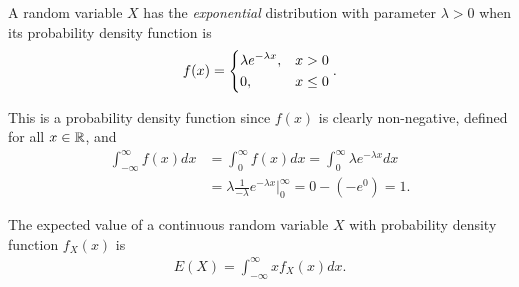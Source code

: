 \begin{defn}
    A random variable $X$ has the \emph{exponential} distribution with parameter $\lambda > 0$ when its probability density function is
    \begin{align}
        f(x) = \begin{dcases}
            \lambda e^{-\lambda x}, & x > 0 \\
            0, & x \leq 0
        \end{dcases}.
    \end{align}
\end{defn}

\begin{exmp}
    This is a probability density function since $f(x)$ is clearly non-negative, defined for all $x \in \mathbb{R}$, and
    \begin{align*}
        \int_{-\infty}^{\infty}f(x)dx &= \int_{0}^{\infty}f(x)dx = \int_{0}^{\infty}\lambda e^{-\lambda x}dx \\
        &= \lambda \frac{1}{-\lambda}e^{-\lambda x}\big\rvert_{0}^{\infty} = 0 - (-e^{0}) = 1.
    \end{align*}
\end{exmp}

\begin{defn}
    The expected value of a continuous random variable $X$ with probability density function $f_X(x)$ is
    \begin{align*}
        E(X) = \int_{-\infty}^{\infty}xf_X(x)dx.
    \end{align*}
\end{defn}

